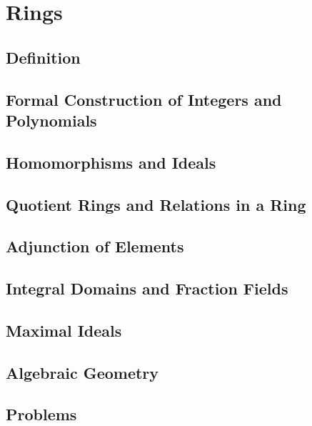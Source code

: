 \chapter{Rings}
\section{Definition}
\section{Formal Construction of Integers and Polynomials}
\section{Homomorphisms and Ideals}
\section{Quotient Rings and Relations in a Ring}
\section{Adjunction of Elements}
\section{Integral Domains and Fraction Fields}
\section{Maximal Ideals}
\section{Algebraic Geometry}
\section{Problems}
